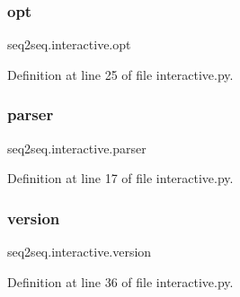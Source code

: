 \subsubsection{\texorpdfstring{opt}{opt}}
{\footnotesize\ttfamily seq2seq.\+interactive.\+opt}



Definition at line 25 of file interactive.\+py.

\mbox{\label{namespaceseq2seq_1_1interactive_a30c7c17d3501869dc954ba79b1bb1703}} 
\subsubsection{\texorpdfstring{parser}{parser}}
{\footnotesize\ttfamily seq2seq.\+interactive.\+parser}



Definition at line 17 of file interactive.\+py.

\mbox{\label{namespaceseq2seq_1_1interactive_ae79ed748b505aa1b31aab802d43545df}} 
\subsubsection{\texorpdfstring{version}{version}}
{\footnotesize\ttfamily seq2seq.\+interactive.\+version}



Definition at line 36 of file interactive.\+py.

